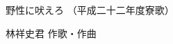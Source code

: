 \documentclass[10pt,b5j]{tarticle} %
\begin{document}
\begin{minipage}[c]{0.7\hsize} %
    \begin{center}
        {\LARGE
            野性に吠えろ %
        }
        {\small 
            （平成二十二年度寮歌） %
        }
    \end{center}
\end{minipage}
\begin{minipage}[c]{0.3\hsize} %
    \begin{flushright} %
        林祥史君 作歌・作曲 %
    \end{flushright}
\end{minipage}
\end{document}

